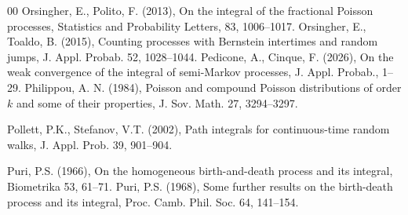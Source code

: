 \documentclass[12pt, twoside, english, headsepline]{article}
\theoremstyle{definition} %
\numberwithin{equation}{section} %
\begin{document}
{\begin{thebibliography}{00}
Orsingher, E., Polito, F. (2013),  On the integral of the fractional Poisson processes, Statistics and Probability Letters, 83, 1006--1017.
%
Orsingher, E., Toaldo, B. (2015), Counting processes with Bernstein intertimes and random jumps, J. Appl. Probab. 52, 1028--1044.
%
Pedicone, A., Cinque, F. (2026), On the weak convergence of the integral of semi-Markov processes, J. Appl. Probab., 1--29.
%
Philippou, A. N. (1984), Poisson and compound Poisson distributions of order $k$ and some of their properties, J. Sov. Math. 27, 3294--3297.
%
%
%

Pollett, P.K., Stefanov, V.T. (2002), Path integrals for continuous-time random walks, J. Appl. Prob. 39, 901--904.

Puri, P.S. (1966), On the homogeneous birth-and-death process and its integral, Biometrika 53, 61--71.
Puri, P.S. (1968), Some further results on the birth-death process and its integral, Proc. Camb. Phil. Soc. 64, 141--154.
%
%


\end{thebibliography}}
\end{document}

